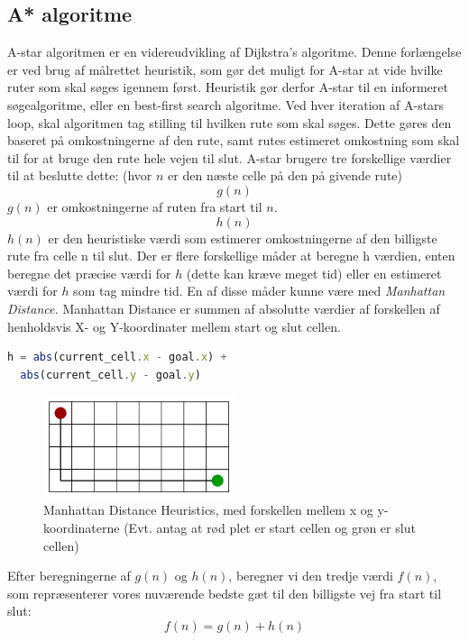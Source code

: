 \documentclass[12pt]{article}
\begin{document}
\subsection{A* algoritme}
A-star algoritmen er en videreudvikling af Dijkstra’s algoritme. Denne forlængelse er ved brug af målrettet heuristik, 
som gør det muligt for A-star at vide hvilke ruter som skal søges igennem først. 
Heuristik gør derfor A-star til en informeret søgealgoritme, eller en best-first search algoritme. 
Ved hver iteration af A-stars loop, skal algoritmen tag stilling til hvilken rute som skal søges. Dette gøres den baseret på omkostningerne af den rute, samt rutes estimeret omkostning som skal til for at bruge den rute hele vejen til slut. A-star brugere tre forskellige værdier til at beslutte dette: 
(hvor $n$ er den næste celle på den på givende rute)\\
\[g(n)\]
$g(n)$  er omkostningerne af ruten fra start til $n$.
\[h(n)\] 
$h(n)$ er den heuristiske værdi som estimerer omkostningerne af den billigste rute fra celle n til slut. 
Der er flere forskellige måder at beregne h værdien, enten beregne det præcise værdi for $h$ (dette kan kræve meget tid) eller en estimeret værdi for $h$ som tag mindre tid. En af disse måder kunne være med \textit{Manhattan Distance.} 
Manhattan Distance er summen af absolutte værdier af forskellen af henholdsvis X- og Y-koordinater mellem start og slut cellen. 
\begin{lstlisting}[language=JavaScript, caption=Manhattan Distance\label{code:Manhattan}]
  h = abs(current_cell.x - goal.x) + 
  abs(current_cell.y - goal.y)
\end{lstlisting}
\begin{figure}[ht]\label{fig:Manhattan}
  \centering
  \includegraphics[width=0.50\textwidth]{../manhattan.png}
  \caption{Manhattan Distance Heuristics, med forskellen mellem x og y-koordinaterne (Evt. antag at rød plet er start cellen og grøn er slut cellen)}
\end{figure}
Efter beregningerne af $g(n)$ og $h(n)$, beregner vi den tredje værdi $f(n)$, 
som repræsenterer vores nuværende bedste gæt til den billigste vej fra start til slut:
\[f(n)= g(n) + h(n)\]
\end{document}
